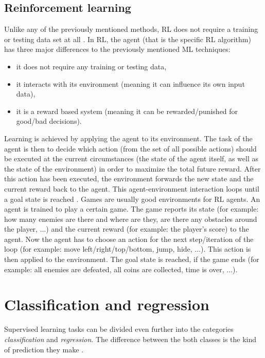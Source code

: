 \documentclass[a4paper]{report}
\begin{document}
    \subsection{Reinforcement learning}
    Unlike any of the previously mentioned methods, \ac{RL} does not require a training or testing data set at all \cite{reinforcement-learning}. In \ac{RL}, the agent (that is the specific \ac{RL} algorithm) has three major differences to the previously mentioned \acl{ML} techniques:
    \begin{itemize}
    \item it does not require any training or testing data,
    \item it interacts with its environment (meaning it can influence its own input data),
    \item it is a reward based system (meaning it can be rewarded/punished for good/bad decisions).
    \end{itemize}
    Learning is achieved by applying the agent to its environment. The task of the agent is then to decide which action (from the set of all possible actions) should be executed at the current circumstances (the state of the agent itself, as well as the state of the environment) in order to maximize the total future reward. After this action has been executed, the environment forwards the new state and the current reward back to the agent. This agent-environment interaction loops until a goal state is reached \cite{reinforcement-learning-silver15}. 
    Games are usually good environments for \ac{RL} agents. An agent is trained to play a certain game. The game reports its state (for example: how many enemies are there and where are they, are there any obstacles around the player, ...) and the current reward (for example: the player's score) to the agent. Now the agent has to choose an action for the next step/iteration of the loop (for example: move left/right/top/bottom, jump, hide, ...). This action is then applied to the environment. The goal state is reached, if the game ends (for example: all enemies are defeated, all coins are collected, time is over, ...). 
    
    \section{Classification and regression}
    
    Supervised learning tasks can be divided even further into the categories \textit{classification} and \textit{regression}.
    The difference between the both classes is the kind of prediction they make \cite{class-and-regr}.
    
\end{document}
